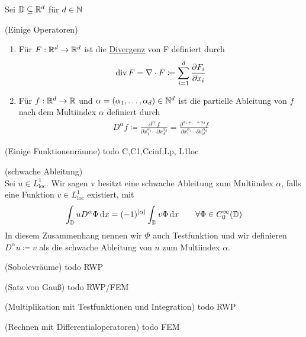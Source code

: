 Sei $\mathbb{D} \subseteq \mathbb{R}^d$ für $d\in \mathbb{N}$
\begin{Definition}(Einige Operatoren)
	\begin{enumerate}
		\item Für $F: \mathbb{R}^d \to \mathbb{R}^d$ ist die \underline{Divergenz} von F definiert durch
			\begin{align*}
				\operatorname{div} F = \nabla \cdot F \coloneqq \sum_{i=1}^{d} \frac{\partial F_i}{ \partial x_i}
			\end{align*}
		\item Für $f: \mathbb{R}^d \to \mathbb{R}$ und $\alpha = (\alpha_1,\dots,\alpha_d) \in \mathbb{N}^d$ ist die partielle Ableitung von $f$ nach dem Multiindex $\alpha$ definiert durch
			\begin{align*}
				D^{\alpha}f \coloneqq 
				\frac{\partial^{|\alpha|} f}{\partial x_1 ^{\alpha_1} \cdots  \partial x_d^{\alpha_d} } 
				=\frac{\partial^{\alpha_1+\dots +\alpha_d} f}{\partial x_1 ^{\alpha_1} \cdots  \partial x_d^{\alpha_d} } 
			\end{align*}
	\end{enumerate}
\end{Definition}
\begin{Definition}(Einige Funktionenräume)
	todo C,C1,Ccinf,Lp, L1loc
\end{Definition}
\begin{Definition}(schwache Ableitung)\\
	Sei $u \in L_{\text{loc}}^1$. Wir sagen v besitzt eine schwache Ableitung zum Multiindex $\alpha$, falls eine Funktion $v \in L_{\text{loc}}^1$ existiert, mit 
	\begin{align*}
		\int_{\mathbb{D}} u D^{\alpha} \Phi \, \mathrm{d} x = (-1)^{|\alpha|} \int_{\mathbb{D}} v \Phi \, \mathrm{d} x \qquad \forall \Phi \in C_0^{\infty}(\mathbb{D})
	\end{align*}
	In diesem Zusammenhang nennen wir $\Phi$ auch Testfunktion und wir definieren $D^{\alpha} u \coloneqq v$ als die schwache Ableitung von $u$ zum Multiindex $\alpha$.
\end{Definition}
\begin{Definition}(Sobolevräume)
	todo RWP 
\end{Definition}
\begin{Satz} (Satz von Gauß)
	todo RWP/FEM
\end{Satz}
\begin{Satz}(Multiplikation mit Testfunktionen und Integration)
	todo RWP
\end{Satz}
\begin{Satz} (Rechnen mit Differentialoperatoren)
	todo FEM
\end{Satz}